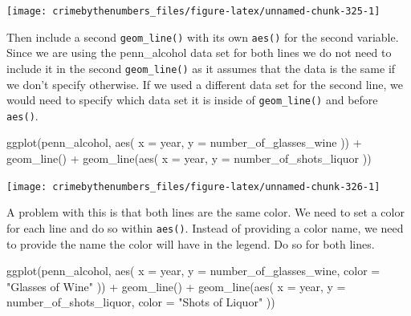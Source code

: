 \documentclass[
  a4paper,
]{krantz}
\makeatletter
\newenvironment{Shaded}{\begin{snugshade}}{\end{snugshade}}
\newcommand{\AttributeTok}[1]{\textcolor[rgb]{0.77,0.63,0.00}{#1}}
\newcommand{\FunctionTok}[1]{\textcolor[rgb]{0.00,0.00,0.00}{#1}}
\newcommand{\NormalTok}[1]{#1}
\newcommand{\SpecialCharTok}[1]{\textcolor[rgb]{0.00,0.00,0.00}{#1}}
\newcommand{\StringTok}[1]{\textcolor[rgb]{0.31,0.60,0.02}{#1}}
\newenvironment{kframe}{%
\medskip{}
\setlength{\fboxsep}{.8em}
 \def\at@end@of@kframe{}%
 \ifinner\ifhmode%
  \def\at@end@of@kframe{\end{minipage}}%
  \begin{minipage}{\columnwidth}%
 \fi\fi%
 \def\FrameCommand##1{\hskip\@totalleftmargin \hskip-\fboxsep
 \colorbox{shadecolor}{##1}\hskip-\fboxsep
     \hskip-\linewidth \hskip-\@totalleftmargin \hskip\columnwidth}%
 \MakeFramed {\advance\hsize-\width
   \@totalleftmargin\z@ \linewidth\hsize
   \@setminipage}}%
 {\par\unskip\endMakeFramed%
 \at@end@of@kframe}
\renewenvironment{Shaded}{\begin{kframe}}{\end{kframe}}
\makeatother
\begin{document}
\begin{center}\texttt{[image: crimebythenumbers\_files/figure-latex/unnamed-chunk-325-1]} \end{center}

Then include a second \texttt{geom\_line()} with its own
\texttt{aes()} for the second variable. Since we are using
the penn\_alcohol data set for both lines we do not need to
include it in the second \texttt{geom\_line()} as it assumes
that the data is the same if we don't specify otherwise. If
we used a different data set for the second line, we would
need to specify which data set it is inside of
\texttt{geom\_line()} and before \texttt{aes()}.

\begin{Shaded}
\begin{Highlighting}[]
\FunctionTok{ggplot}\NormalTok{(penn\_alcohol, }\FunctionTok{aes}\NormalTok{(}
  \AttributeTok{x =}\NormalTok{ year,}
  \AttributeTok{y =}\NormalTok{ number\_of\_glasses\_wine}
\NormalTok{)) }\SpecialCharTok{+}
  \FunctionTok{geom\_line}\NormalTok{() }\SpecialCharTok{+}
  \FunctionTok{geom\_line}\NormalTok{(}\FunctionTok{aes}\NormalTok{(}
    \AttributeTok{x =}\NormalTok{ year,}
    \AttributeTok{y =}\NormalTok{ number\_of\_shots\_liquor}
\NormalTok{  ))}
\end{Highlighting}
\end{Shaded}

\begin{center}\texttt{[image: crimebythenumbers\_files/figure-latex/unnamed-chunk-326-1]} \end{center}

A problem with this is that both lines are the same color.
We need to set a color for each line and do so within
\texttt{aes()}. Instead of providing a color name, we need
to provide the name the color will have in the legend. Do so
for both lines.

\begin{Shaded}
\begin{Highlighting}[]
\FunctionTok{ggplot}\NormalTok{(penn\_alcohol, }\FunctionTok{aes}\NormalTok{(}
  \AttributeTok{x =}\NormalTok{ year,}
  \AttributeTok{y =}\NormalTok{ number\_of\_glasses\_wine,}
  \AttributeTok{color =} \StringTok{"Glasses of Wine"}
\NormalTok{)) }\SpecialCharTok{+}
  \FunctionTok{geom\_line}\NormalTok{() }\SpecialCharTok{+}
  \FunctionTok{geom\_line}\NormalTok{(}\FunctionTok{aes}\NormalTok{(}
    \AttributeTok{x =}\NormalTok{ year,}
    \AttributeTok{y =}\NormalTok{ number\_of\_shots\_liquor,}
    \AttributeTok{color =} \StringTok{"Shots of Liquor"}
\NormalTok{  ))}
\end{Highlighting}
\end{Shaded}
\end{document}
